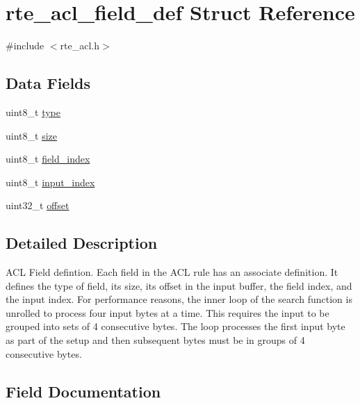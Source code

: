 \hypertarget{structrte__acl__field__def}{}\section{rte\+\_\+acl\+\_\+field\+\_\+def Struct Reference}
\label{structrte__acl__field__def}


{\ttfamily \#include $<$rte\+\_\+acl.\+h$>$}

\subsection*{Data Fields}
\begin{DoxyCompactItemize}
\item 
uint8\+\_\+t \hyperlink{structrte__acl__field__def_a1d127017fb298b889f4ba24752d08b8e}{type}
\item 
uint8\+\_\+t \hyperlink{structrte__acl__field__def_ae5dc6ffcd9b7605c7787791e40cc6bb0}{size}
\item 
uint8\+\_\+t \hyperlink{structrte__acl__field__def_aa63bd1fe49046f2c9ef0478a050b7c3a}{field\+\_\+index}
\item 
uint8\+\_\+t \hyperlink{structrte__acl__field__def_a92f339699e74f468bf5355e4d76f6a79}{input\+\_\+index}
\item 
uint32\+\_\+t \hyperlink{structrte__acl__field__def_a894bdfa2d603d8343f8ef01dda6fcd23}{offset}
\end{DoxyCompactItemize}


\subsection{Detailed Description}
A\+C\+L Field defintion. Each field in the A\+C\+L rule has an associate definition. It defines the type of field, its size, its offset in the input buffer, the field index, and the input index. For performance reasons, the inner loop of the search function is unrolled to process four input bytes at a time. This requires the input to be grouped into sets of 4 consecutive bytes. The loop processes the first input byte as part of the setup and then subsequent bytes must be in groups of 4 consecutive bytes. 

\subsection{Field Documentation}
\hypertarget{structrte__acl__field__def_aa63bd1fe49046f2c9ef0478a050b7c3a}{}
